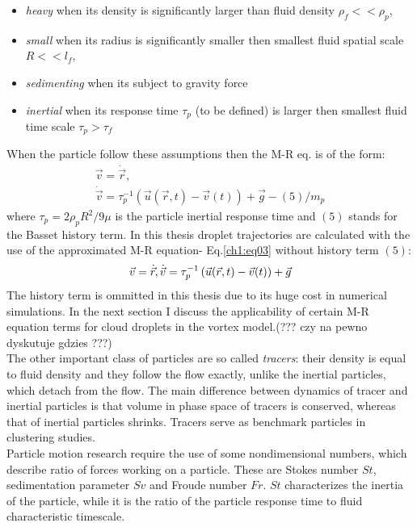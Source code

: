 \documentclass[../main.tex]{subfiles}
\begin{document}
\begin{itemize}
\item \emph{heavy} when its density is significantly larger than fluid density $\rho_f<<\rho_p$,
\item \emph{small} when its radius is significantly smaller then smallest fluid spatial scale $R<<l_f$,
\item \emph{sedimenting} when its subject to gravity force
\item \emph{inertial} when its response time $\tau_p$ (to be defined) is larger then smallest fluid time scale $\tau_p>\tau_f$
\end{itemize}
When the particle follow these assumptions then the M-R eq. is of the form:
\begin{align}
\vec{v}=\dot{\vec{r}},\\
\dot{\vec{v}}=\tau_p^{-1}\left(\vec{u}(\vec{r},t) -\vec{v}(t)\right)+\vec{g}-(5)/m_p
\label{ch1:eq03}
\end{align}
where $\tau_p=2 \rho_p R^2/9\mu$ is the particle inertial response time and $(5)$ stands for the Basset history term. In this thesis droplet trajectories are calculated with the use of the approximated M-R equation- Eq.\ref{ch1:eq03} without history term $(5)$:
\begin{equation}
\vec{v}=\dot{\vec{r}},\\
\dot{\vec{v}}=\tau_p^{-1}\left(\vec{u}(\vec{r},t) -\vec{v}(t)\right)+\vec{g}
\label{ch1:eq04}
\end{equation}
The history term is ommitted in this thesis due to its huge cost in numerical simulations. In the next section I discuss the applicability of certain M-R equation terms for cloud droplets in the vortex model.(??? czy na pewno dyskutuje gdzies ???)\\ 
The other important class of particles are so called \emph{tracers}: their density is equal to fluid density and they follow the flow exactly, unlike the inertial particles, which detach from the flow. The main difference between dynamics of tracer and inertial particles is that volume in phase space of tracers is conserved, whereas that of inertial particles shrinks. Tracers serve as benchmark particles in clustering studies.\\
Particle motion research require the use of some nondimensional numbers, which describe ratio of forces working on a particle. These are Stokes number $St$, sedimentation parameter $Sv$ and Froude number $Fr$. $St$ characterizes the inertia of the particle, while it is the ratio of the particle response time to fluid characteristic timescale. 
\end{document}
